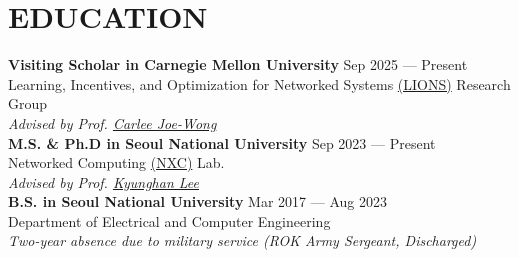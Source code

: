 \section*{EDUCATION}

\noindent
\textbf{Visiting Scholar in Carnegie Mellon University} \hfill Sep 2025 --- Present \\
Learning, Incentives, and Optimization
for Networked Systems \href{https://research.ece.cmu.edu/lions/}{(LIONS)} Research Group \\
\textit{Advised by Prof. \href{https://www.andrew.cmu.edu/user/cjoewong/}{Carlee Joe-Wong}} \\

\noindent
\textbf{M.S. \& Ph.D in Seoul National University} \hfill Sep 2023 --- Present \\
Networked Computing \href{https://nxc.snu.ac.kr}{(NXC)} Lab. \\
\textit{Advised by Prof. \href{https://scholar.google.com/citations?user=IwQCRuQAAAAJ&hl=en}{Kyunghan Lee}} \\

\noindent
\textbf{B.S. in Seoul National University} \hfill Mar 2017 --- Aug 2023 \\
Department of Electrical and Computer Engineering \\
\textit{Two-year absence due to military service (ROK Army Sergeant, Discharged)}
